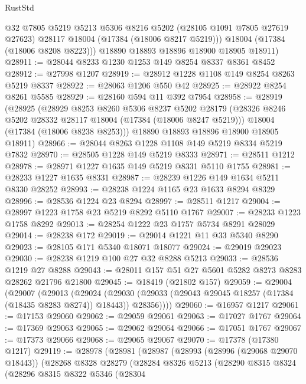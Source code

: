\begin{lexlean}{RustStd}
\begin{coremodule}
          @32
          @7805
          @5219
          @5213
          @5306
          @8216
          @5202
          (@28105 @1091 @7805 @27619 @27623)
          @28117
          @18004
          (@17384 (@18006 @8217 @5219)))
        @18004
        (@17384 (@18006 @8208 @8223)))
      @18890
      @18893
      @18896
      @18900
      @18905
      @18911)
@28911 := @28044 @8233 @1230 @1253 @149 @8254 @8337 @8361 @8452
@28912 := @27998 @1207
@28919 := @28912 @1228 @1108 @149 @8254 @8263 @5219 @8337
@28922 := @28063 @1206 @550 @42
@28925 := @28922 @8254 @8261 @5585
@28929 := @28160 @594 @11 @392 @7954
@28958 := @28919
    (@28925
      (@28929
        @8253
        @8260
        @5306
        @8237
        @5202
        @28179
        (@28326 @8246 @5202 @28332 @28117 @18004 (@17384 (@18006 @8247 @5219)))
        @18004
        (@17384 (@18006 @8238 @8253)))
      @18890
      @18893
      @18896
      @18900
      @18905
      @18911)
@28966 := @28044 @8263 @1228 @1108 @149 @5219 @8334 @5219 @7832
@28970 := @28505 @1228 @149 @5219 @8333
@28971 := @28511 @1212
@28978 := @28971 @1227 @1635 @149 @5219 @8331 @5110 @1755
@28981 := @28233 @1227 @1635 @8331
@28987 := @28239 @1226 @149 @1634 @5211 @8330 @28252
@28993 := @28238 @1224 @1165 @23 @1633 @8294 @8329
@28996 := @28536 @1224 @23 @8294
@28997 := @28511 @1217
@29004 := @28997 @1223 @1758 @23 @5219 @8292 @5110 @1767
@29007 := @28233 @1223 @1758 @8292
@29013 := @28254 @1222 @23 @1757 @5734 @8291 @28029
@29014 := @28238 @172
@29019 := @29014 @1221 @11 @33 @5340 @8290
@29023 := @28105 @171 @5340 @18071 @18077
@29024 := @29019 @29023
@29030 := @28238 @1219 @100 @27 @32 @8288 @5213
@29033 := @28536 @1219 @27 @8288
@29043 := @28011 @157 @51 @27 @5601 @5282 @8273 @8283 @28262 @21796 @21800
@29045 := @18419 (@21802 @157)
@29059 := @29004
    (@29007
      (@29013
        (@29024
          (@29030 (@29033 (@29043 @29045 @18257 (@17384 (@18435 @8283 @8274)) @18443)) @28356))))
@29060 := @16957 @1217
@29061 := @17153 @29060
@29062 := @29059 @29061
@29063 := @17027 @1767
@29064 := @17369 @29063
@29065 := @29062 @29064
@29066 := @17051 @1767
@29067 := @17373 @29066
@29068 := @29065 @29067
@29070 := @17378 (@17380 @1217)
@29119 := @28978
    (@28981
      (@28987
        (@28993
          (@28996 (@29068 @29070 @18443))
          (@28268
            @8328
            @28279
            (@28284
              @8326
              @5213
              (@28290
                @8315
                @8324
                (@28296
                  @8315
                  @8322
                  @5346
                  (@28304

\end{coremodule}
\end{lexlean}
